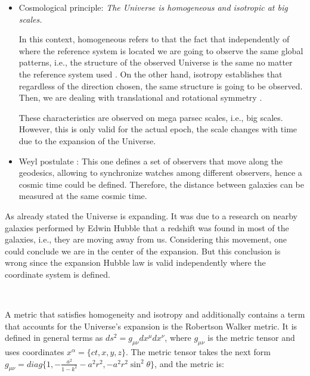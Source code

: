 \begin{itemize}
\item Cosmological principle: \emph{ The Universe is homogeneous and isotropic 
at big scales.}


In this context, homogeneous refers to that the fact that independently of 
where the reference system is located we are going to observe the same global 
patterns, i.e., the structure of the observed Universe is the same no matter 
the reference system used \cite{padma}.
On the other hand, isotropy establishes that regardless of the direction chosen, 
the same structure is going to be observed. Then, we are dealing with translational
and rotational symmetry \cite{padma}. 

These characteristics are observed on mega parsec scales, i.e., big scales. 
However, this is only valid for the actual epoch, the scale changes with time due 
to the expansion of the Universe. 


\item Weyl postulate : This one defines a set of observers that move along the geodesics,
allowing to synchronize watches among different observers,
hence a cosmic time could be defined. Therefore, the distance between galaxies can
be measured at the same cosmic time. 

\end{itemize} 

As already stated the Universe is expanding. It was due to a research on nearby 
galaxies performed by Edwin Hubble that a redshift was found in most of the 
galaxies, i.e., they are moving away from us. 
Considering this movement, one could conclude we are in the center of the 
expansion. But this conclusion is wrong since the expansion Hubble law is
valid independently where the coordinate system is defined. 

\

A metric that satisfies homogeneity and isotropy and additionally
contains a term that accounts for the Universe's expansion is the Robertson 
Walker metric. It is defined in general terms as $ds^2 = g_{\mu\nu}dx^{\mu}dx^{\nu}$, 
where $g_{\mu\nu}$ is the metric tensor and uses coordinates $x^{\alpha} = \{ct,x,y,z\}$.
The metric tensor takes the next form $ g_{\mu\nu} = diag\{1,-\frac{a^2}{1-k^2}
-a^2r^2,-a^2r^2\sin^2\theta\}$, and the metric is:

